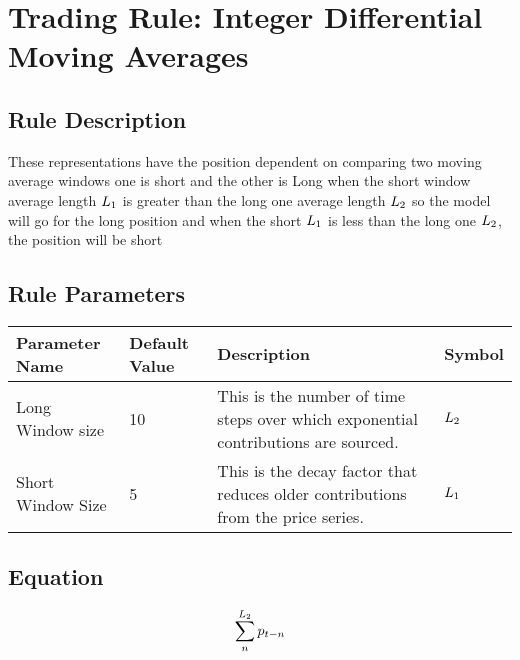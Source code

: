 \documentclass{article}
\begin{document}
\begin{figure}
\end{figure}


\section*{Trading Rule: Integer Differential Moving Averages}

\subsection{Rule Description}


These representations have the position dependent on comparing two moving average windows one is short and the other is Long when the short window average length $L_{1}$ is greater than the long one average length $L_{2}$ so the model will go for the long position and when the short $L_{1}$ is less than the long one $L_{2}$, the position will be short \\

\subsection{Rule Parameters}
\begin{center}
\begin{tabular}{|m{9em}| m{3em}| m{15em}| m{3em}|}
\hline
Parameter Name & Default Value &	Description & Symbol \\
\hline
Long Window size & 	10	 & This is the number of time steps over which exponential contributions are sourced. & $L_{2}$ \\
\hline
Short Window Size & 	5	 & This is the decay factor that reduces older contributions from the price series. & $L_{1}$ \\
\hline

\end{tabular}
\end{center}

\subsection{Equation}


\begin{equation}
\sum_{n}^{L_{2}} p_{t - n} \\
\label{eq1}
\end{equation}
\end{document}
